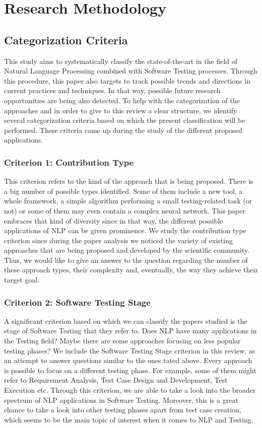 \chapter{Research Methodology}

\section {Categorization Criteria}
This study aims to systematically classify the state-of-the-art in the field of Natural Language Processing combined with Software Testing 
processes. Through this procedure, this paper also targets to track possible trends and directions in current practices and techniques. In that 
way, possible future research opportunities are being also detected. To help with the categorization of the approaches and in order to give to this review a 
clear structure, we identify several categorization criteria based on which the present classification will be performed. These criteria came up during the study of 
the different proposed applications. 

\subsection {Criterion 1: Contribution Type}
This criterion refers to the kind of the approach that is being proposed. There is a big number of possible types identified. Some of them include a new tool, 
a whole framework, a simple algorithm performing a small testing-related task (or not) or some of them may even contain a complex neural network. This paper embraces that kind of 
diversity since in that way, the different possible applications of NLP can be given prominence. We study the contribution type criterion since during the paper analysis we 
noticed the variety of existing approaches that are being proposed and developed by the scientific community. Thus, we would like to give an answer to the question regarding 
the number of these approach types, their complexity and, eventually, the way they achieve their target goal.

\subsection {Criterion 2: Software Testing Stage}
A significant criterion based on which we can classify the papers studied is the stage of Software Testing that they refer to. Does NLP have many applications in the Testing field? 
Maybe there are some approaches focusing on less popular testing phases? We include the Software Testing Stage criterion in this review, as an attempt to answer questions similar 
to the ones tated above. Every approach is possible to focus on a different testing phase. For example, some of them might refer to Requirement Analysis, Test Case Design and Development, Test 
Execution etc. Through this criterion, we are able to take a look into the broader spectrum of NLP applications in Software Testing. Moreover, this is a great chance to take a 
look into other testing phases apart from test case creation, which seems to be the main topic of interest when it comes to NLP and Testing.


